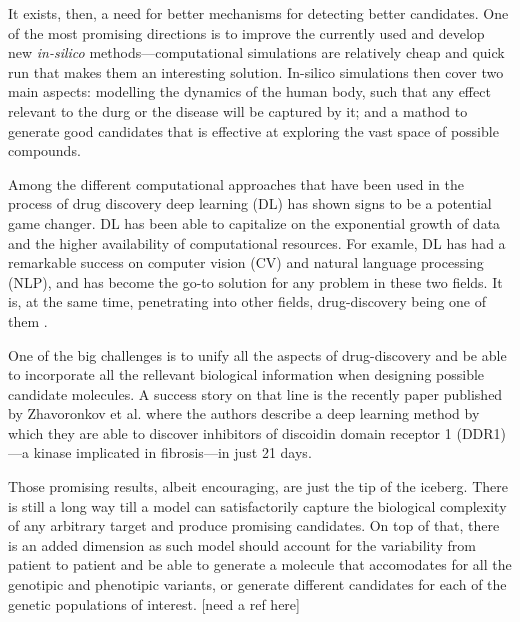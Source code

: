 \documentclass{article}
\begin{document}
It exists, then, a need for better mechanisms for detecting better candidates. One of
 the most promising directions is to improve the currently used and develop new
 \emph{in-silico} methods—computational simulations are relatively cheap and quick run
 that makes them an interesting solution. In-silico simulations then cover two main
 aspects: modelling the dynamics of the human body, such that any effect relevant to the
 durg or the disease will be captured by it; and a mathod to generate good candidates
 that is effective at exploring the vast space of possible compounds.





Among the different computational approaches that have been used in the process of drug
 discovery deep learning (DL) has shown signs to be a potential game changer. DL has
 been able to capitalize on the exponential growth of data and the higher availability
 of computational resources. For examle, DL has had a remarkable success on computer
 vision (CV) and natural language processing (NLP), and has become the go-to solution
 for any problem in these two fields. It is, at the same time, penetrating into other
 fields, drug-discovery being one of them \cite{Chen2018}. 

One of the big challenges is to unify all the aspects of drug-discovery and be able to
 incorporate all the rellevant biological information when designing possible candidate
 molecules. A success story on that line is the recently paper published by Zhavoronkov
 et al. \cite{Zhavoronkov2019} where the authors describe a deep learning method by
 which they are able to discover inhibitors of discoidin domain receptor 1 (DDR1)—a
 kinase implicated in fibrosis—in just 21 days.

Those promising results, albeit encouraging, are just the tip of the iceberg. There is
still a long way till a model can satisfactorily capture the biological complexity of
any arbitrary target and produce promising candidates. On top of that, there is an added
dimension as such model should account for the variability from patient to patient and
be able to generate a molecule that accomodates for all the genotipic and phenotipic
variants, or generate different candidates for each of the genetic populations of
interest. [need a ref here]
\end{document}
